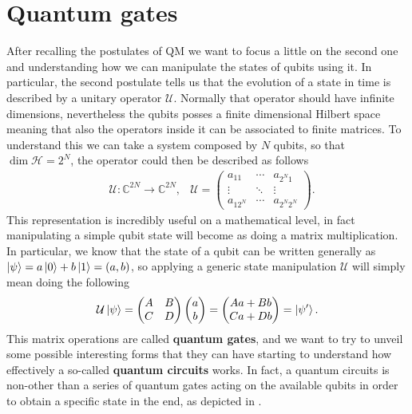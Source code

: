 \section{Quantum gates}

After recalling the postulates of QM we want to focus a little on the second one and understanding how we can manipulate the states of qubits using it. In particular, the second postulate tells us that the evolution of a state in time is described by a unitary operator $\mathcal{U}$. Normally that operator should have infinite dimensions, nevertheless the qubits posses a finite dimensional Hilbert space meaning that also the operators inside it can be associated to finite matrices. To understand this we can take a system composed by $N$ qubits, so that $\dim\mathcal{H} = 2^N$, the operator could then be described as follows
\begin{align}
    &\mathcal{U}: \mathbb{C}^{2N} \to \mathbb{C}^{2N}, &\mathcal{U} = \begin{pmatrix}
        a_{11} & \cdots & a_{2^{N}1}\\
        \vdots & \ddots & \vdots\\
        a_{12^N} & \cdots & a_{2^N2^N}
    \end{pmatrix}.
\end{align}
This representation is incredibly useful on a mathematical level, in fact manipulating a simple qubit state will become as doing a matrix multiplication. In particular, we know that the state of a qubit can be written generally as $\ket{\psi} = a\ket{0} + b\ket{1} = (a, b)$, so applying a generic state manipulation $\mathcal{U}$ will simply mean doing the following
\begin{equation}
    \label{eq:singleQuOp}
    \mathcal{U}\ket{\psi} = \begin{pmatrix}
        A & B\\
        C & D
    \end{pmatrix}\begin{pmatrix}
        a\\
        b
    \end{pmatrix} = 
    \begin{pmatrix}
        Aa + Bb\\
        Ca + Db
    \end{pmatrix} = \ket{\psi'}.
\end{equation}
This matrix operations are called \textbf{quantum gates}, and we want to try to unveil some possible interesting forms that they can have starting to understand how effectively a so-called \textbf{quantum circuits} works. In fact, a quantum circuits is non-other than a series of quantum gates acting on the available qubits in order to obtain a specific state in the end, as depicted in .
